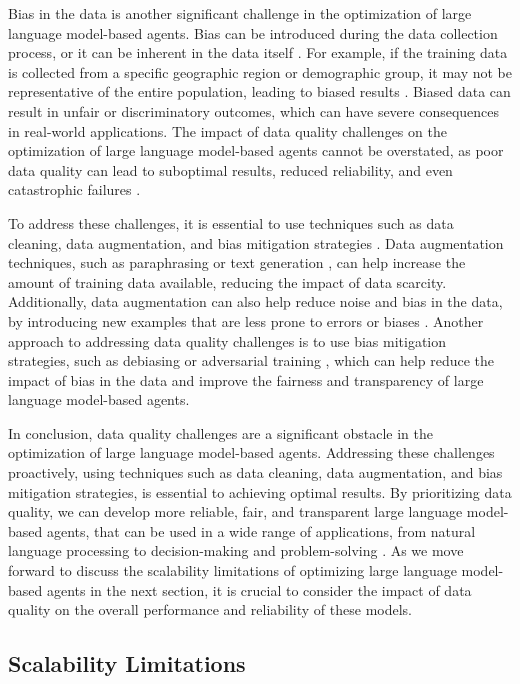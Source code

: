 \documentclass[11pt]{article}
\begin{document}
Bias in the data is another significant challenge in the optimization of large language model-based agents. Bias can be introduced during the data collection process, or it can be inherent in the data itself \cite{ref247}. For example, if the training data is collected from a specific geographic region or demographic group, it may not be representative of the entire population, leading to biased results \cite{ref248}. Biased data can result in unfair or discriminatory outcomes, which can have severe consequences in real-world applications. The impact of data quality challenges on the optimization of large language model-based agents cannot be overstated, as poor data quality can lead to suboptimal results, reduced reliability, and even catastrophic failures \cite{ref40}.

To address these challenges, it is essential to use techniques such as data cleaning, data augmentation, and bias mitigation strategies \cite{ref249}. Data augmentation techniques, such as paraphrasing or text generation \cite{ref250}, can help increase the amount of training data available, reducing the impact of data scarcity. Additionally, data augmentation can also help reduce noise and bias in the data, by introducing new examples that are less prone to errors or biases \cite{ref251}. Another approach to addressing data quality challenges is to use bias mitigation strategies, such as debiasing or adversarial training \cite{ref252}, which can help reduce the impact of bias in the data and improve the fairness and transparency of large language model-based agents.

In conclusion, data quality challenges are a significant obstacle in the optimization of large language model-based agents. Addressing these challenges proactively, using techniques such as data cleaning, data augmentation, and bias mitigation strategies, is essential to achieving optimal results. By prioritizing data quality, we can develop more reliable, fair, and transparent large language model-based agents, that can be used in a wide range of applications, from natural language processing to decision-making and problem-solving \cite{ref31}. As we move forward to discuss the scalability limitations of optimizing large language model-based agents in the next section, it is crucial to consider the impact of data quality on the overall performance and reliability of these models.

\subsection{Scalability Limitations}
\end{document}
